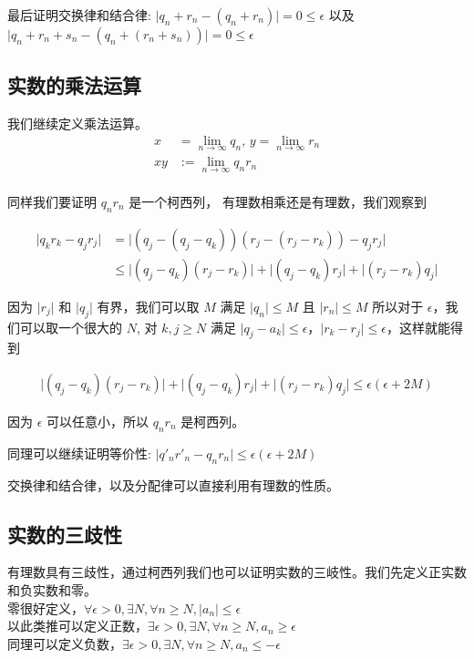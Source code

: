 最后证明交换律和结合律: $ \lvert q_n + r_n - (q_n + r_n) \rvert = 0 \le \epsilon $ 以及 $ \lvert q_n + r_n + s_n - (q_n + (r_n + s_n)) \rvert = 0 \le \epsilon $ \\

\subsection{实数的乘法运算}
我们继续定义乘法运算。 \\
\begin{align*} 
x & = \lim_{n \to \infty}q_n,\, y  = \lim_{n \to \infty} r_n \\
xy & := \lim_{n \to \infty} q_nr_n 
\end{align*} \\

同样我们要证明 $q_nr_n$ 是一个柯西列， 有理数相乘还是有理数，我们观察到

\begin{align*}
\lvert q_kr_k - q_jr_j \rvert &= \lvert (q_j - (q_j - q_k)) (r_j - (r_j - r_k)) - q_jr_j \rvert \\
& \le \lvert  (q_j - q_k)(r_j - r_k)  \rvert + \lvert  (q_j - q_k)r_j  \rvert + \lvert  (r_j - r_k)q_j  \rvert
\end{align*}

因为 $\lvert r_j \rvert$ 和 $\lvert q_j \rvert$ 有界，我们可以取 $M$ 满足 $\lvert q_n \rvert \le M$ 且 $\lvert r_n \rvert \le M$ 所以对于 $\epsilon$，我们可以取一个很大的 $N$, 对 $k,j \ge N $ 满足 $\lvert q_j - a_k \rvert \le \epsilon $，$ \lvert r_k - r_j \rvert \le \epsilon$，这样就能得到

\begin{align*}
\lvert  (q_j - q_k)(r_j - r_k)  \rvert + \lvert  (q_j - q_k)r_j  \rvert + \lvert  (r_j - r_k)q_j  \rvert \le \epsilon(\epsilon + 2M)
\end{align*}

因为 $\epsilon$ 可以任意小，所以 $q_nr_n$ 是柯西列。

同理可以继续证明等价性: $\lvert q'_nr'_n - q_nr_n\rvert \le \epsilon(\epsilon + 2M)$

交换律和结合律，以及分配律可以直接利用有理数的性质。

\subsection{实数的三歧性}
有理数具有三歧性，通过柯西列我们也可以证明实数的三岐性。我们先定义正实数和负实数和零。\\
零很好定义，$\forall \epsilon >0, \exists N, \forall n \ge N, \lvert a_n \rvert \le \epsilon$ \\
以此类推可以定义正数，$\exists \epsilon > 0, \exists N, \forall n \ge N, a_n \ge \epsilon $ \\
同理可以定义负数，$\exists \epsilon > 0, \exists N, \forall n \ge N, a_n \le -\epsilon $

